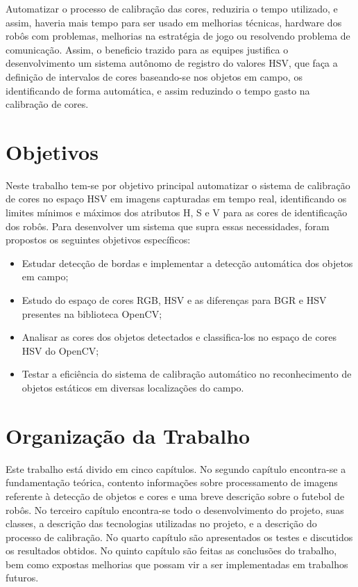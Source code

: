 Automatizar o processo de calibração das cores, reduziria o tempo utilizado, e assim, haveria mais tempo para ser usado em melhorias técnicas, hardware dos robôs com problemas, melhorias na estratégia de jogo ou resolvendo problema de comunicação. Assim, o beneficio trazido para as equipes justifica o desenvolvimento um sistema autônomo de registro do valores HSV, que faça a definição de intervalos de cores baseando-se nos objetos em campo, os identificando de forma automática, e assim reduzindo o tempo gasto na calibração de cores. 
\section{Objetivos}
Neste trabalho tem-se por objetivo principal automatizar o sistema de calibração de cores no espaço HSV em imagens capturadas em tempo real, identificando os limites mínimos e máximos dos atributos H, S e V para as cores de identificação dos robôs.  
Para desenvolver um sistema que supra essas necessidades, foram propostos os seguintes objetivos específicos:

\begin{itemize}
	\item Estudar detecção de bordas e implementar a detecção automática dos objetos em campo; 
	\item Estudo do espaço de cores RGB, HSV e as diferenças para BGR e HSV presentes na biblioteca OpenCV;
	\item Analisar as cores dos objetos detectados e classifica-los no espaço de cores HSV do OpenCV;
	\item Testar a eficiência do sistema de calibração automático no reconhecimento de objetos estáticos em diversas localizações do campo.
	
	
\end{itemize}

\section{Organização da Trabalho} \label{Sec:Organizacao}

Este trabalho está divido em cinco capítulos. No segundo capítulo encontra-se a fundamentação teórica, contento informações sobre processamento de imagens referente à detecção de objetos e cores e uma breve descrição sobre o futebol de robôs. No terceiro capítulo encontra-se todo o desenvolvimento do projeto, suas classes, a descrição das tecnologias utilizadas no projeto, e a descrição do processo de calibração. No quarto capítulo são apresentados os testes e discutidos os resultados obtidos. No quinto capítulo são feitas as conclusões do trabalho, bem como expostas melhorias que possam vir a ser implementadas em trabalhos futuros.

